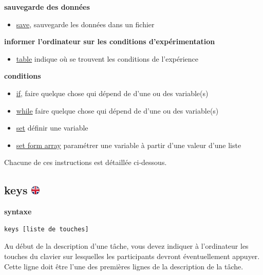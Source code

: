 \documentclass[
]{book}
\providecommand{\tightlist}{%
  \setlength{\itemsep}{0pt}\setlength{\parskip}{0pt}}
\begin{document}
\textbf{sauvegarde des données}

\begin{itemize}
\tightlist
\item
  \protect\hyperlink{task-save}{save}, sauvegarde les données dans un fichier
\end{itemize}

\textbf{informer l'ordinateur sur les conditions d'expérimentation}

\begin{itemize}
\tightlist
\item
  \protect\hyperlink{task-table}{table} indique où se trouvent les conditions de l'expérience
\end{itemize}

\textbf{conditions}

\begin{itemize}
\tightlist
\item
  \protect\hyperlink{task-if}{if}, faire quelque chose qui dépend de d'une ou des variable(s)
\item
  \protect\hyperlink{task-while}{while} faire quelque chose qui dépend de d'une ou des variable(s)
\item
  \protect\hyperlink{task-set}{set} définir une variable
\item
  \protect\hyperlink{array-variable}{set form array} paramétrer une variable à partir d'une valeur d'une liste
\end{itemize}

Chacune de ces instructions est détaillée ci-dessous.

\hypertarget{keys}{%
\subsection[keys ]{\texorpdfstring{keys \href{https://www.psytoolkit.org/doc3.4.0/syntax.html\#task-keys}{\protect\includegraphics{img/ukflag.png}}}{keys }}\label{keys}}

\textbf{syntaxe}

\begin{verbatim}
keys [liste de touches]
\end{verbatim}

Au début de la description d'une tâche, vous devez indiquer à l'ordinateur les touches du clavier sur lesquelles les participants devront éventuellement appuyer. Cette ligne doit être l'une des premières lignes de la description de la tâche.
\end{document}
